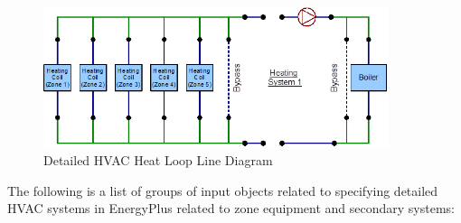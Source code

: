 \begin{figure}[hbtp] 
\centering
\includegraphics[width=0.9\textwidth, height=0.9\textheight, keepaspectratio=true]{media/HvacHeatLoop.png}
\caption{Detailed HVAC Heat Loop Line Diagram}
\end{figure}

The following is a list of groups of input objects related to specifying
detailed HVAC systems in EnergyPlus related to zone equipment and
secondary systems:
